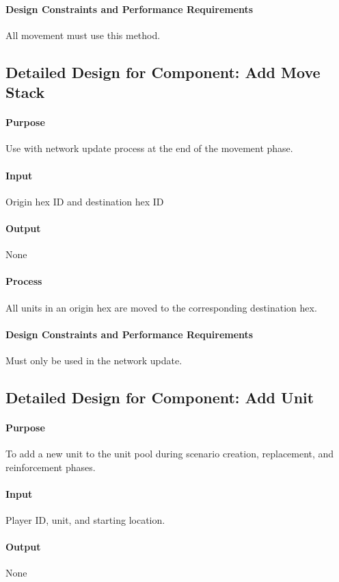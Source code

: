 \documentclass[12pt,a4paper,titlepage]{article}
\begin{document}
\paragraph{Design Constraints and Performance Requirements} All movement must use this method.

\subsection{Detailed Design for Component: Add Move Stack}
\paragraph{Purpose} Use with network update process at the end of the movement phase.
\paragraph{Input} Origin hex ID and destination hex ID
\paragraph{Output} None
\paragraph{Process} All units in an origin hex are moved to the corresponding destination hex.
\paragraph{Design Constraints and Performance Requirements} Must only be used in the network update.

\subsection{Detailed Design for Component: Add Unit}
\paragraph{Purpose} To add a new unit to the unit pool during scenario creation, replacement, and reinforcement phases.
\paragraph{Input} Player ID, unit, and starting location.
\paragraph{Output} None
\end{document}

